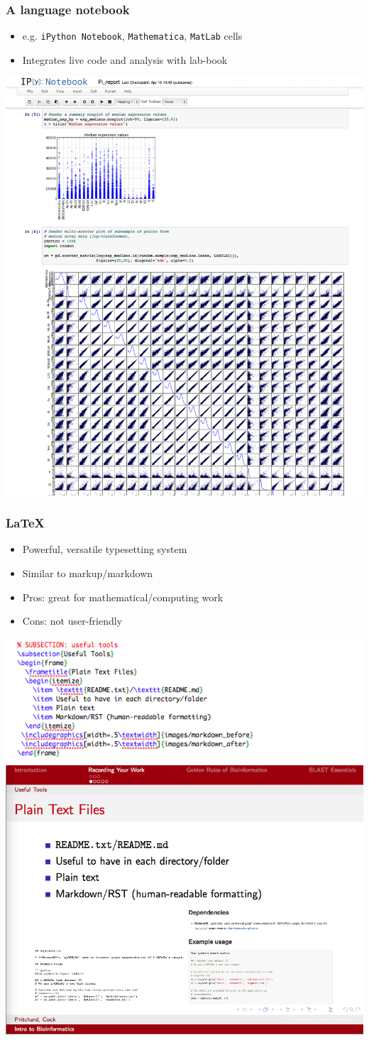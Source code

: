 \documentclass[table]{beamer}
\begin{document}
   \begin{frame}
     \frametitle{A language notebook}
     \begin{itemize}
       \item e.g. \texttt{iPython Notebook}, \texttt{Mathematica}, \texttt{MatLab} cells
       \item Integrates live code and analysis with lab-book
     \end{itemize}
    \includegraphics[width=.5\textwidth]{images/ipython_notebook}     
   \end{frame}

   \begin{frame}
     \frametitle{\LaTeX}
     \begin{itemize}
       \item Powerful, versatile typesetting system
       \item Similar to markup/markdown
       \item Pros: great for mathematical/computing work
       \item Cons: not user-friendly
     \end{itemize}
    \includegraphics[width=.35\textwidth]{images/latex_before}
    \includegraphics[width=.35\textwidth]{images/latex_after}     
   \end{frame}
\end{document}
